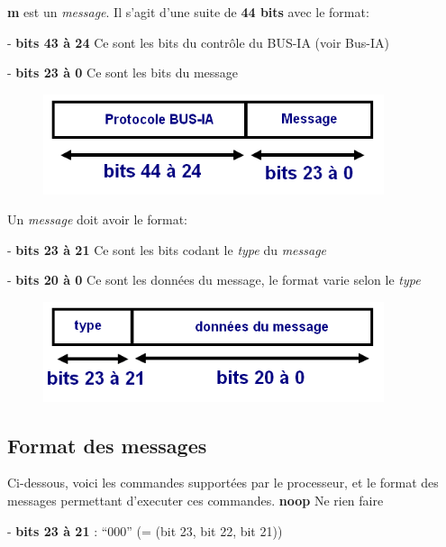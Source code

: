 \documentclass[10pt]{article}
\begin{document}
        \textbf{m} est un \textit{message}. Il s'agit d'une suite de \textbf{44 bits} avec le format:
        
        - \textbf{bits 43 à 24} Ce sont les bits du contrôle du BUS-IA (voir Bus-IA)
        
        - \textbf{bits 23 à 0} Ce sont les bits du message

        \begin{figure}[h!]
            \includegraphics[width=10cm]{messages1.png}
        \end{figure}

        Un \textit{message} doit avoir le format:
        
        - \textbf{bits 23 à 21} Ce sont les bits codant le \textit{type} du \textit{message}
        
        - \textbf{bits 20 à 0} Ce sont les données du message, le format varie selon le \textit{type}
        
        \begin{figure}[h!]
            \includegraphics[width=10cm]{messages2.png}
        \end{figure}
        
        \newpage
        \subsection{Format des messages}\label{formatmsg}
        
        Ci-dessous, voici les commandes supportées par le processeur,
        et le format des messages permettant d'executer ces commandes.
        \newline
        \newline
        \textbf{noop} Ne rien faire
        
        - \textbf{bits 23 à 21} : ``000'' (= (bit 23, bit 22, bit 21))
\end{document}
